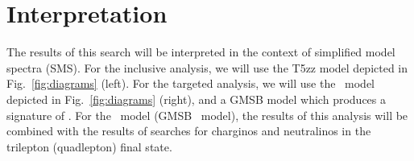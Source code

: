 \section{Interpretation}

The results of this search will be interpreted in the context of simplified model spectra (SMS).
For the inclusive analysis, we will use the T5zz model depicted in Fig.~\ref{fig:diagrams} (left).
For the targeted analysis, we will use the \wzmet\ model depicted in Fig.~\ref{fig:diagrams} (right),
and a GMSB model which produces a signature of \zzmet. For the \wzmet\ model (GMSB \zzmet\ model), the results of this
analysis will be combined with the results of searches for charginos and neutralinos in the trilepton (quadlepton)
final state.
